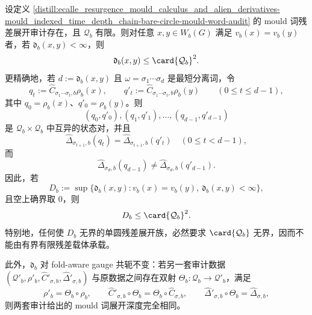 \begin{theorem}\label{distill:ecalle_resurgence_mould_calculus_and_alien_derivatives-mould_indexed_time_depth_chain-bare-circle-mould-word-depth-compactness}
设定义 \ref{distill:ecalle_resurgence_mould_calculus_and_alien_derivatives-mould_indexed_time_depth_chain-bare-circle-mould-word-audit} 的 mould 词残差展开审计存在，且 \(\mathcal Q_b\) 有限。则对任意 \(x,y\in W_b(G)\) 满足 \(v_b(x)=v_b(y)\) 者，若
\(\mathfrak d_b(x,y)<\infty\)，则
\[
\mathfrak d_b(x,y)\le \card{\mathcal Q_b}^{2}.
\]
更精确地，若 \(d:=\mathfrak d_b(x,y)\) 且 \(\omega=\sigma_1\cdots\sigma_d\) 是最短分离词，令
\[
q_t:=\widehat C_{\sigma_1\cdots\sigma_t,b}\rho_b(x),\qquad
q'_t:=\widehat C_{\sigma_1\cdots\sigma_t,b}\rho_b(y)
\qquad(0\le t\le d-1),
\]
其中 \(q_0=\rho_b(x)\)、\(q'_0=\rho_b(y)\)。则
\[
(q_0,q'_0),(q_1,q'_1),\ldots,(q_{d-1},q'_{d-1})
\]
是 \(\mathcal Q_b\times\mathcal Q_b\) 中互异的状态对，并且
\[
\widehat\Delta_{\sigma_{t+1},b}(q_t)=
\widehat\Delta_{\sigma_{t+1},b}(q'_t)\quad(0\le t<d-1),
\]
而
\[
\widehat\Delta_{\sigma_d,b}(q_{d-1})\ne
\widehat\Delta_{\sigma_d,b}(q'_{d-1}).
\]
因此，若
\[
D_b:=\sup\{\mathfrak d_b(x,y):v_b(x)=v_b(y),\ \mathfrak d_b(x,y)<\infty\},
\]
且空上确界取 \(0\)，则
\[
D_b\le \card{\mathcal Q_b}^{2}.
\]
特别地，任何使 \(D_b\) 无界的单圆残差展开族，必然要求 \(\card{\mathcal Q_b}\) 无界，因而不能由有界有限残差载体承载。

此外，\(\mathfrak d_b\) 对 fold-aware gauge 共轭不变：若另一套审计数据 \((\mathcal Q'_b,\rho'_b,\widehat C'_{\sigma,b},\widehat\Delta'_{\sigma,b})\) 与原数据之间存在双射
\(\Theta_b:\mathcal Q_b\to\mathcal Q'_b\)，满足
\[
\rho'_b=\Theta_b\circ\rho_b,\qquad
\widehat C'_{\sigma,b}\circ\Theta_b=\Theta_b\circ\widehat C_{\sigma,b},\qquad
\widehat\Delta'_{\sigma,b}\circ\Theta_b=\widehat\Delta_{\sigma,b},
\]
则两套审计给出的 mould 词展开深度完全相同。
\end{theorem}
